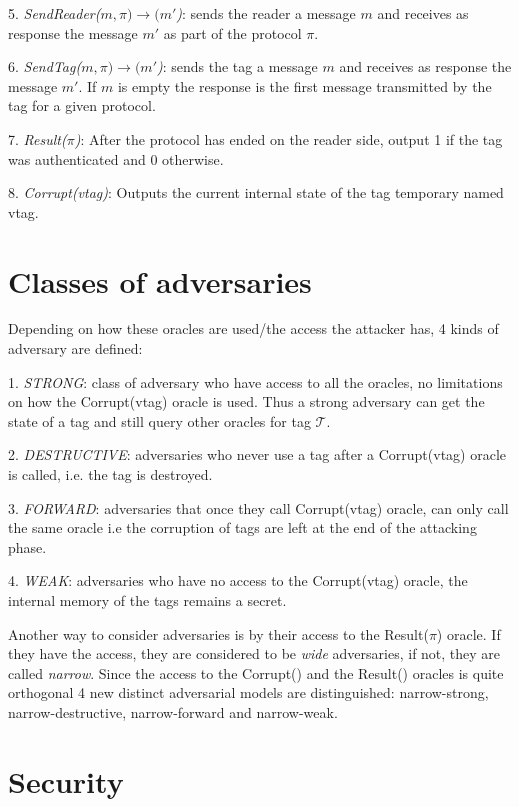     5. \textit{SendReader($m, \pi) \rightarrow (m'$)}: sends the reader a message $m$ and receives as response 
    the message $m'$ as part of the protocol $\pi$.

    6. \textit{SendTag($m, \pi) \rightarrow (m'$)}: sends the tag a message $m$ and receives as response 
    the message $m'$. If $m$ is empty the response is the first message transmitted by the tag for
    a given protocol. 

    7. \textit{Result($\pi$)}: After the protocol has ended on the reader side, output 1 if the tag was 
    authenticated and 0 otherwise.

    8. \textit{Corrupt(vtag)}: Outputs the current internal state of the tag temporary named vtag. 

\section{Classes of adversaries}
    Depending on how these oracles are used/the access the attacker has, 4 kinds of adversary are defined:
    
    1. \textit{STRONG}: class of adversary who have access to all the oracles, no limitations on how the Corrupt(vtag) oracle
    is used. Thus a strong adversary can get the state of a tag and still query other oracles for tag $\mathcal{T}$.

    2. \textit{DESTRUCTIVE}: adversaries who never use a tag after a Corrupt(vtag) oracle is called,
        i.e. the tag is destroyed.

    3. \textit{FORWARD}: adversaries that once they call Corrupt(vtag) oracle, can only call the same oracle
        i.e the corruption of tags are left at the end of the attacking phase.

    4. \textit{WEAK}: adversaries who have no access to the Corrupt(vtag) oracle, the internal memory of the tags remains a secret. 

    Another way to consider adversaries is by their access to the Result($\pi$) oracle. If they have the access, they are considered to be
    \textit{wide} adversaries, if not, they are called \textit{narrow}. Since the access to the Corrupt() and the Result() oracles
    is quite orthogonal 4 new distinct adversarial models are distinguished: narrow-strong, narrow-destructive, narrow-forward and narrow-weak.

\section{Security}

